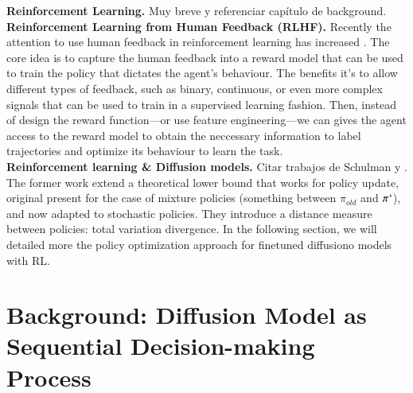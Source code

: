 \textbf{Reinforcement Learning.} Muy breve y referenciar capítulo de background.\\

\textbf{Reinforcement Learning from Human Feedback (RLHF).} Recently the attention to use human feedback in reinforcement learning has increased \cite{kaufmann2023survey}. The core idea is to capture the human feedback into a reward model that can be used to train the policy that dictates the agent's behaviour. The benefits it's to allow different types of feedback, such as binary, continuous, or even more complex signals that can be used to train in a supervised learning fashion. Then, instead of design the reward function---or use feature engineering---we can gives the agent access to the reward model to obtain the neccessary information to label trajectories and optimize its behaviour to learn the task. \\



\textbf{Reinforcement learning \& Diffusion models.} Citar trabajos de Schulman \citep{schulman2015trust} y \citep{schulman2017proximal}. The former work extend a theoretical lower bound that works for policy update, original present for the case of mixture policies (something between $\pi_{old}$ and $\pi`$), and now adapted to stochastic policies. They introduce a distance measure between policies: total variation divergence. In the following section, we will detailed more the policy optimization approach for finetuned diffusiono models with RL.\\

\section{Background: Diffusion Model as Sequential Decision-making Process}

